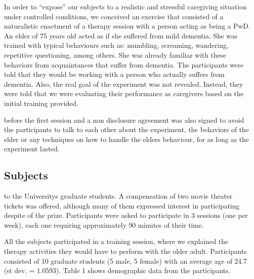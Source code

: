 In order to ``expose'' our subjects to a realistic and
stressful caregiving situation under controlled conditions,
we conceived an exercise that consisted of a naturalistic
enactment of a therapy session with a person acting as being
a PwD. An elder of 75 years old acted as if she suffered
from mild dementia. She was trained with typical behaviours
such as: mumbling, screaming, wandering, repetitive questioning,
among others. She was already familiar with these behaviors
from acquaintances that suffer from dementia. The participants
were told that they would be working with a person who actually
suffers from dementia. Also, the real goal of the experiment
was not revealed. Instead, they were told that we were 
evaluating their performance as caregivers based on the 
initial training provided.

before the first session and a non disclosure agreement
was also signed to avoid the participants to talk to each
other about the experiment, the behaviors of the elder or
any techniques on how to handle the elder\textquotesingle s
behaviour, for as long as the experiment lasted.

\subsection{Subjects}
to the University\textquotesingle s graduate students.
A compensation of two movie theater tickets was offered,
although many of them expressed interest in participating
despite of the prize. Participants were asked to participate
in 3 sessions (one per week), each one requiring approximately
90 minutes of their time. 

All the subjects participated in a training session, where we
explained the therapy activities they would have to perform
with the older adult.
Participants consisted of 10 graduate students (5 male,
5 female) with an average age of 24.7 (st dev. = 1.0593). 
Table 1 shows demographic data from the participants. 

